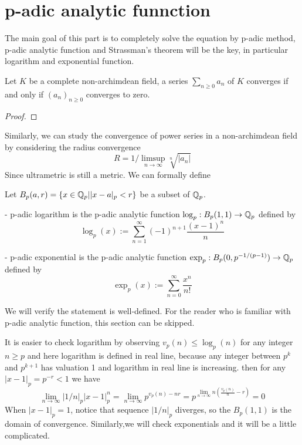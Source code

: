 \section{p-adic analytic funnction}

The main goal of this part is to completely solve the equation by p-adic method, p-adic analytic function and Strassman's theorem will be the key, in particular logarithm and exponential function. 

\begin{proposition}
    Let \(K\) be a complete non-archimdean field, a series \(\sum_{n \geq 0} a_n\) of \(K\) converges if and only if \((a_n)_{n \geq 0}\) converges to zero.

    \begin{proof}
        
    \end{proof}
\end{proposition}

Similarly, we can study the convergence of power series in a non-archimdean field by considering the radius convergence
\[R = 1/\limsup_{n \rightarrow \infty}\sqrt[n]{|a_n|}\]
Since ultrametric is still a metric. We can formally define 
\begin{definition}
    Let \(B_p(a,r) = \{x \in \mathbb{Q}_p| |x-a|_p <r \}\) be a subset of \(\mathbb{Q}_p\).

    - p-adic logarithm is the p-adic analytic function \(\log_p: B_p(1,1) \to \mathbb{Q}_p\) defined by
    \[\log_p(x) := \sum_{n=1}^{\infty} (-1)^{n+1} \frac{(x-1)^n}{n}\]

    - p-adic exponential is the p-adic analytic function \(\exp_p : B_p(0,p^{-1/(p-1)}) \to \mathbb{Q}_p\) defined by
    \[\exp_p (x) :=  \sum_{n=0}^{\infty} \frac{x^n}{n!}\]
\end{definition}

We will verify the statement is well-defined. For the reader who is familiar with p-adic analytic function, this section can be skipped.

It is easier to check logarithm by observing \(v_p(n) \leq \log_p(n)\) for any integer \(n \geq p\) and here logarithm is defined in real line, because any integer between \(p^k\) and \(p^{k+1}\) has valuation 1 and logarithm in real line is increasing. then for any \(|x-1|_p = p^{-r} < 1\) we have
\[ \lim_{n \rightarrow \infty} |1/n|_p |x-1|_p^n =\lim_{n \rightarrow \infty} p^{v_p(n)-nr} = p^{\lim_{n \rightarrow \infty}n(\frac{v_p(n)}{n}-r)} = 0\]
When \(|x-1|_p = 1\), notice that sequence \(|1/n|_p\) diverges, so the \(B_p(1,1)\) is the domain of convergence. Similarly,we will check exponentials and it will be a little complicated.


